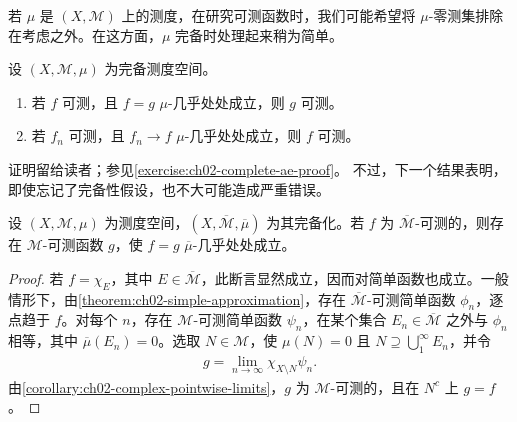 \documentclass[../../main.tex]{subfiles}%
\begin{document}
若 $\mu$ 是 $(X,\mathscr{M})$ 上的测度，在研究可测函数时，我们可能希望将 $\mu$-零测集排除在考虑之外。在这方面，$\mu$ 完备时处理起来稍为简单。
\begin{proposition}\label{proposition:ch02-complete-ae-measurability}
设 $(X,\mathscr{M},\mu)$ 为完备测度空间。
\begin{enumerate}
\item\label{item:ch02-complete-ae-equality} 若 $f$ 可测，且 $f=g$ $\mu$-几乎处处成立，则 $g$ 可测。
\item\label{item:ch02-complete-ae-limit} 若 $f_n$ 可测，且 $f_n\to f$ $\mu$-几乎处处成立，则 $f$ 可测。
\end{enumerate}
\end{proposition}
证明留给读者；参见\cref{exercise:ch02-complete-ae-proof}。
不过，下一个结果表明，即使忘记了完备性假设，也不大可能造成严重错误。

\begin{proposition}\label{proposition:ch02-measurable-version-completion}
设 $(X,\mathscr{M},\mu)$ 为测度空间，$(X,\overline{\mathscr{M}},\overline{\mu})$ 为其完备化。若 $f$ 为 $\overline{\mathscr{M}}$-可测的，则存在 $\mathscr{M}$-可测函数 $g$，使 $f=g$ $\overline{\mu}$-几乎处处成立。
\end{proposition}
\begin{proof}
若 $f=\chi_E$，其中 $E\in\overline{\mathscr{M}}$，此断言显然成立，因而对简单函数也成立。一般情形下，由\cref{theorem:ch02-simple-approximation}，存在 $\overline{\mathscr{M}}$-可测简单函数 $\phi_n$，逐点趋于 $f$。对每个 $n$，存在 $\mathscr{M}$-可测简单函数 $\psi_n$，在某个集合 $E_n\in\overline{\mathscr{M}}$ 之外与 $\phi_n$ 相等，其中 $\overline{\mu}(E_n)=0$。选取 $N\in\mathscr{M}$，使 $\mu(N)=0$ 且 $N\supseteq\bigcup_1^\infty E_n$，并令
\begin{align*}
g=\lim_{n\to\infty}\chi_{X\setminus N}\psi_n.
\end{align*}
由\cref{corollary:ch02-complex-pointwise-limits}，$g$ 为 $\mathscr{M}$-可测的，且在 $N^c$ 上 $g=f$。
\end{proof}
\end{document}
